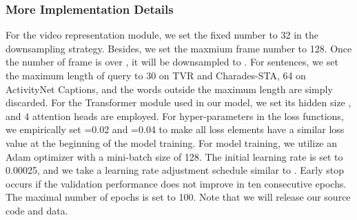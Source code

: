 \documentclass[sigconf]{acmart}
\begin{document}
\subsubsection{More Implementation Details}\label{sec:details}
For the video representation module, we set the fixed number  to 32 in the downsampling strategy.
Besides, we set the maxmium frame number  to 128. Once the number of frame is over , it will be downsampled to .
For sentences, we set the maximum length of query  to 30 on TVR and Charades-STA, 64 on ActivityNet Captions, and the words outside the maximum length are simply discarded.
For the Transformer module used in our model, we set its hidden size , and 4 attention heads are employed.
For hyper-parameters in the loss functions, we empirically set =0.02 and =0.04 to make all loss elements have a similar loss value at the beginning of the model training.
For model training, we utilize an Adam optimizer with a mini-batch size of 128. 
The initial learning rate is set to 0.00025, and we take a learning rate adjustment schedule similar to \cite{lei2020tvr}. 
Early stop occurs if the validation performance does not improve in ten consecutive epochs. The maximal number of epochs is set to 100. Note that we will release our source code and data.
\end{document}

